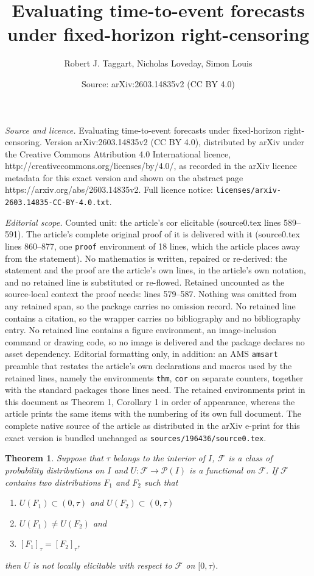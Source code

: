 \documentclass[10pt,a4paper]{amsart}
\title{Evaluating time-to-event forecasts under fixed-horizon right-censoring}
\author{Robert J. Taggart, Nicholas Loveday, Simon Louis}
\date{Source: arXiv:2603.14835v2 (CC BY 4.0)}
\newtheorem{thm}{Theorem}
\begin{document}
\maketitle

\noindent\emph{Source and licence.} Evaluating time-to-event forecasts under fixed-horizon right-censoring. Version arXiv:2603.14835v2 (CC BY 4.0), distributed by arXiv under the Creative Commons Attribution 4.0 International licence, http://creativecommons.org/licenses/by/4.0/, as recorded in the arXiv licence metadata for this exact version and shown on the abstract page https://arxiv.org/abs/2603.14835v2. Full licence notice: \texttt{licenses/arxiv-2603.14835-CC-BY-4.0.txt}.\par\smallskip

\noindent\textit{Editorial scope.} Counted unit: the article's cor elicitable (source0.tex lines 589--591). The article's complete original proof of it is delivered with it (source0.tex lines 860--877, one \texttt{proof} environment of 18 lines, which the article places away from the statement). No mathematics is written, repaired or re-derived: the statement and the proof are the article's own lines, in the article's own notation, and no retained line is substituted or re-flowed.  Retained uncounted as the source-local context the proof needs: lines 579--587.  Nothing was omitted from any retained span, so the package carries no omission record.  No retained line contains a citation, so the wrapper carries no bibliography and no bibliography entry.  No retained line contains a figure environment, an image-inclusion command or drawing code, so no image is delivered and the package declares no asset dependency.  Editorial formatting only, in addition: an AMS \texttt{amsart} preamble that restates the article's own declarations and macros used by the retained lines, namely the environments \texttt{thm}, \texttt{cor} on separate counters, together with the standard packages those lines need.  The retained environments print in this document as Theorem 1, Corollary 1 in order of appearance, whereas the article prints the same items with the numbering of its own full document.  The complete native source of the article as distributed in the arXiv e-print for this exact version is bundled unchanged as \texttt{sources/196436/source0.tex}.
\begin{thm}\label{thm:not prov elic}
Suppose that $\tau$ belongs to the interior of $I$, $\mathcal{F}$ is a class of probability distributions on $I$ and $U:\mathcal{F}\to\mathcal{P}(I)$ is a functional on $\mathcal{F}$. If $\mathcal{F}$ contains two distributions $F_1$ and $F_2$ such that
\begin{enumerate}
\item[(a)] $U(F_1) \subset(0,\tau)$ and $U(F_2) \subset(0,\tau)$ 
\item[(b)] $U(F_1) \neq U(F_2)$ and
\item[(c)] $[F_1]_\tau = [F_2]_\tau$,
\end{enumerate}
then $U$ is not locally elicitable with respect to $\mathcal{F}$ on $[0,\tau)$.
\end{thm}
\end{document}
